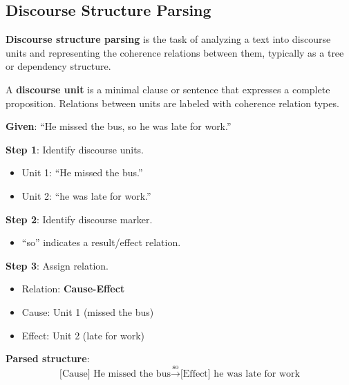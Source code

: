 \documentclass[11pt,a4paper]{article}
\begin{document}
\subsection{Discourse Structure Parsing}

\textbf{Discourse structure parsing} is the task of analyzing a text into discourse units and representing the coherence relations between them, typically as a tree or dependency structure.

A \textbf{discourse unit} is a minimal clause or sentence that expresses a complete proposition. Relations between units are labeled with coherence relation types.

\begin{center}
\end{center}

\begin{tcolorbox}[colback=green!5!white,colframe=green!75!black,title=\textbf{Worked Example: Discourse Structure Parsing}]
\textbf{Given}: ``He missed the bus, so he was late for work.''

\textbf{Step 1}: Identify discourse units.
\begin{itemize}
    \item Unit 1: ``He missed the bus.''
    \item Unit 2: ``he was late for work.''
\end{itemize}

\textbf{Step 2}: Identify discourse marker.
\begin{itemize}
    \item ``so'' indicates a result/effect relation.
\end{itemize}

\textbf{Step 3}: Assign relation.
\begin{itemize}
    \item Relation: \textbf{Cause-Effect}
    \item Cause: Unit 1 (missed the bus)
    \item Effect: Unit 2 (late for work)
\end{itemize}

\textbf{Parsed structure}:
\[
\text{[Cause] He missed the bus} \xrightarrow{\text{so}} \text{[Effect] he was late for work}
\]
\end{tcolorbox}
\end{document}
